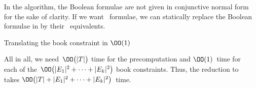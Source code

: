 \begin{myproof}
In the algorithm, the Boolean formulae are not given in conjunctive normal
form for the sake of clarity. If we want \CNF~formulae, we can statically replace
the Boolean formulae in  by their \CNF~equivalents.


\SetAlFnt{\footnotesize\sf}
\begin{Ualgorithm}[\placement]
\caption[Translating the book constraint in $\OO(1)$]{Translating the book constraint in $\OO(1)$ }\label{alg:translate}




\BlankLine

\end{Ualgorithm}

All in all, we need~$\OO\bigl(|T|\bigr)$ time for the precomputation and
$\OO(1)$~time for each of the~$\OO\bigl(|E_1|^2+\dotsb+|E_k|^2\bigr)$ book constraints.
Thus, the reduction to \probQTreeSat takes $\OO\bigl(|T| + |E_1|^2 + \dotsb + |E_k|^2\bigr)$~time.\qedhere

\end{myproof}

